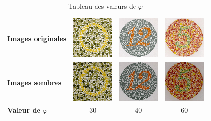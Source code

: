 \documentclass[a4paper,11pt]{article}
\begin{document}
\begin{table}[H]
  \begin{center}
  
    \begin{tabular}{|l||c|c|c|}
    
      \hline
    
      \bf Images originales &
      \includegraphics[width=80px]{images/it1_72pp.png} & 
      \includegraphics[width=80px]{images/it2_72pp.png} & 
      \includegraphics[width=80px]{images/it3_72pp.png} \\
      
      \hline
       
      \bf Images sombres &
      \includegraphics[width=80px]{images/it1_72pp_sombre.png} &
      \includegraphics[width=80px]{images/it2_72pp_sombre.png} &
      \includegraphics[width=80px]{images/it3_72pp_sombre.png}\\
      
      \hline
      
      \bf Valeur de $\varphi$ &
      30 &
      40 &
      60\\
      
      \hline
    \end{tabular}
    
    \caption{Tableau des valeurs de $\varphi$}
    \label{tab:}
    
  \end{center}
\end{table}
\end{document}
